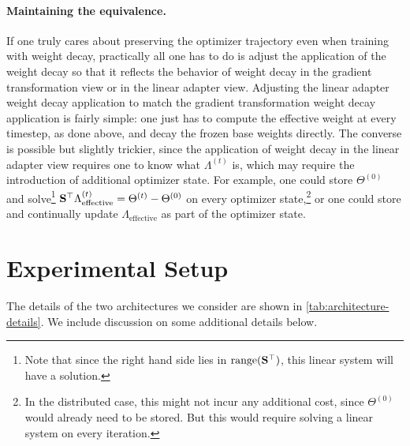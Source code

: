 \paragraph{Maintaining the equivalence.} If one truly cares about preserving the optimizer trajectory even when training with weight decay, practically all one has to do is adjust the application of the weight decay so that it reflects the behavior of weight decay in the gradient transformation view or in the linear adapter view.
Adjusting the linear adapter weight decay application to match the gradient transformation weight decay application is fairly simple: one just has to compute the effective weight at every timestep, as done above, and decay the frozen base weights directly.
The converse is possible but slightly trickier, since the application of weight decay in the linear adapter view requires one to know what $\Lambda^{(t)}$ is, which may require the introduction of additional optimizer state. For example, one could store $\Theta^{(0)}$ and solve\footnote{Note that since the right hand side lies in $\operatorname{range} ({\mathbf{S}}^\top)$, this linear system will have a solution.} ${\mathbf{S}}^\top \Lambda_\text{effective}^{(t)} = \Theta^{(t)} - \Theta^{(0)}$ on every optimizer state,\footnote{ In the distributed case, this might not incur any additional cost, since $\Theta^{(0)}$ would already need to be stored. But this would require solving a linear system on every iteration.} or one could store and continually update $\Lambda_\text{effective}$ as part of the optimizer state.

\section{Experimental Setup}
\label{sec:architectural-details}

The details of the two architectures we consider are shown in \cref{tab:architecture-details}.
We include discussion on some additional details below.

